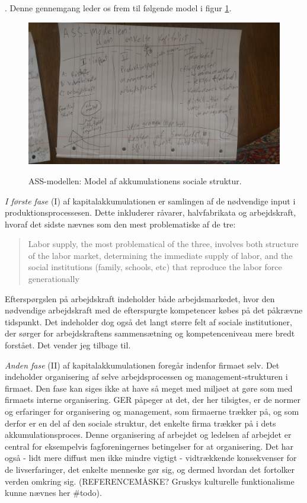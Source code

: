 %
.
Denne gennemgang leder os frem til følgende model i figur \ref{fig_ASSmodel}.
%
\begin{figure}[H]
\begin{centering}
	\caption{ASS-modellen: Model af akkumulationens sociale struktur.}
	\includegraphics[width=\textwidth]{fig/ASS-model.jpg}
	\label{fig_ASSmodel}
\end{centering}
\end{figure}
%

\emph{I første fase} (I) af kapitalakkumulationen er samlingen af de nødvendige input i produktionsprocessesen. Dette inkluderer råvarer, halvfabrikata og arbejdskraft, hvoraf det sidste nævnes som den mest problematiske af de tre:  
%
\begin{quote} \small %
Labor supply, the most problematical of the three, involves both structure of the labor market, determining the immediate supply of labor, and the social institutions (family, schools, etc) that reproduce the labor force generationally \label{aksocstruk}
\end{quote}
%
Efterspørgslen på arbejdskraft indeholder både arbejdsmarkedet, hvor den nødvendige arbejdskraft med de efterspurgte kompetencer købes på det påkrævne tidspunkt. Det indeholder dog også det langt større felt af sociale institutioner, der sørger for arbejdskraftens sammensætning og kompetenceniveau mere bredt forstået. Det vender jeg tilbage til.


\emph{Anden fase} (II) af kapitalakkumulationen foregår indenfor firmaet selv. Det indeholder organisering af selve arbejdsprocessen og management-strukturen i firmaet. Den fase kan siges ikke at have så meget med miljøet at gøre som med firmaets interne organisering. GER påpeger at det, der her tilsigtes, er de normer og erfaringer for organisering og management, som firmaerne trækker på, og som derfor er en del af den sociale struktur, det enkelte firma trækker på i dets akkumulationsproces. Denne organisering af arbejdet og ledelsen af arbejdet er central for eksempelvis fagforeningernes betingelser for at organisering. Det har også - lidt mere diffust men ikke mindre vigtigt - vidtrækkende konsekvenser for de livserfaringer, det enkelte menneske gør sig, og dermed hvordan det fortolker verden omkring sig. (REFERENCEMÅSKE? Gruskys kulturelle funktionalisme kunne nævnes her \#todo). 

